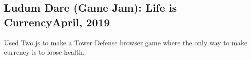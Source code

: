 \documentclass[../Resume.tex]{subfiles}
\begin{document}
	\subsection{Ludum Dare (Game Jam): Life is Currency\null\hfill April, 2019}
	\par Used Two.js to make a Tower Defense browser game where the only way to make currency is to loose health.
	\vspace*{-2mm}
\end{document}
